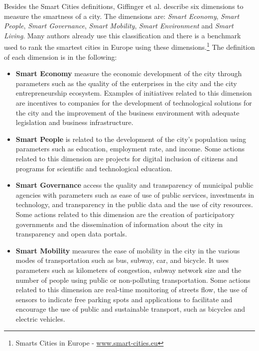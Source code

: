 Besides the Smart Cities definitions, Giffinger et al. \citep{giffinger2007smart} describe six dimensions to measure the smartness of a city. The dimensions are: \textit{Smart Economy}, \textit{Smart People}, \textit{Smart Governance}, \textit{Smart Mobility}, \textit{Smart Environment} and \textit{Smart Living}. Many authors already use this classification \citep{munoz2011forefront,papa2013towards} and there is a benchmark used to rank the smartest cities in Europe using these dimensions.\footnote{Smarts Cities in Europe - \url{www.smart-cities.eu}} The definition of each dimension is in the following:

\begin{itemize}

    \item \textbf{Smart Economy} measure the economic development of the city through parameters such as the quality of the enterprises in the city and the city entrepreneurship ecosystem. Examples of initiatives related to this dimension are incentives to companies for the development of technological solutions for the city and the improvement of the business environment with adequate legislation and business infrastructure. 
    
    \item \textbf{Smart People} is related to the development of the city's population using parameters such as education, employment rate, and income. Some actions related to this dimension are projects for digital inclusion of citizens and programs for scientific and technological education. 
     
    \item \textbf{Smart Governance} access the quality and transparency of municipal public agencies with parameters such as ease of use of public services, investments in technology, and transparency in the public data and the use of city resources. Some actions related to this dimension are the creation of participatory governments and the dissemination of information about the city in transparency and open data portals.
 
    \item \textbf{Smart Mobility} measures the ease of mobility in the city in the various modes of transportation such as bus, subway, car, and bicycle. It uses parameters such as kilometers of congestion, subway network size and the number of people using public or non-polluting transportation. Some actions related to this dimension are real-time monitoring of streets flow, the use of sensors to indicate free parking spots and applications to facilitate and encourage the use of public and sustainable transport, such as bicycles and electric vehicles.
 

\end{itemize}
